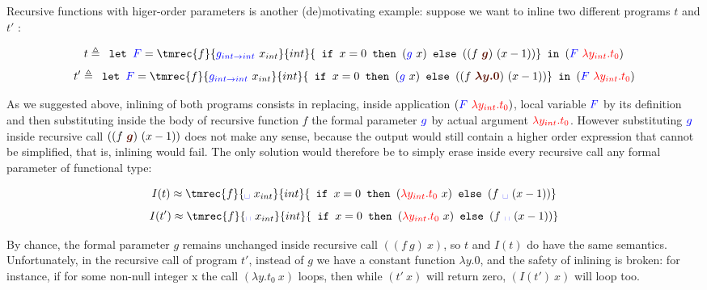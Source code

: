 \documentclass[a4paper,11pt,oneside]{article}
\theoremstyle{plain}
\begin{document}
Recursive functions with  higer-order parameters is another (de)motivating
example: suppose we want to inline two different programs $t$ and $t'$ :\vspace{-0.4cm}
	\begin{figure}[H]
	\label{fig:rec-bad-ex} 
		\begin{footnotesize}
	$$ t \triangleq 
		\texttt{ let } \textcolor{blue}{F} =
  		\tmrec{f}{\textcolor{blue}{g_{int \rightarrow int}}~x_{int}}{int} 
  		{\texttt{ if } x = 0 
  		\texttt{ then } (\textcolor{blue}{g}~x) 
  		\texttt{ else }((f~\textcolor{Sepia}{\boldsymbol{g}})~(x - 1))} 
  		\texttt{ in }
  		(\textcolor{blue}{F}~\textcolor{red}{\lambda y_{int}. t_0})$$ 
  $$t' \triangleq 
  \texttt{ let } \textcolor{blue}{F} =
  \tmrec{f}{\textcolor{blue}{g_{int \rightarrow int}}~x_{int}}{int} 
  {\texttt{ if } x = 0 
  \texttt{ then } (\textcolor{blue}{g}~x) 
  \texttt{ else } ((f~\textcolor{Sepia}{\boldsymbol{\lambda y. 0}})~(x-1))} 
  \texttt{ in }(\textcolor{blue}{F}~\textcolor{red}{\lambda y_{int}.t_0}) $$
  \end{footnotesize}
   
  \end{figure}  \vspace{-0.4cm}
As we suggested above, inlining of both programs consists in replacing,
inside application $(\textcolor{blue}{F}~\textcolor{red}{\lambda y_{int}. t_0})$, 
local variable $\textcolor{blue}{F}$ by its definition and
then substituting inside the body of recursive function $f$ the formal parameter
$\textcolor{blue}{g}$ by actual argument 
$\textcolor{red}{\lambda y_{int}. t_0}$. 
However substituting $\textcolor{blue}{g}$ inside recursive call 
$((f~\textcolor{Sepia}{\boldsymbol{g}})~(x - 1))$ does not make any sense,
because the output would still contain a higher order expression that cannot be
simplified, that is, inlining would fail. The only solution would therefore be to
simply erase inside every recursive call any formal parameter of functional
type:
	\begin{footnotesize}
	$$ I(t) \approx
  \tmrec{f}{\textcolor{blue}{\text{\textvisiblespace}}~x_{int}}{int}
  	{\texttt{ if } x = 0\texttt{ then }(\textcolor{red}{\lambda y_{int}.t_0}~x)
    \texttt{ else } (f~\textcolor{blue}{\text{\textvisiblespace}}~(x-1))} $$
	$$ I(t') \approx
  \tmrec{f}{\textcolor{blue}{\text{\textvisiblespace}}~x_{int}}{int} 
  	{\texttt{ if }x = 0\texttt{ then }(\textcolor{red}{\lambda y_{int}.t_0}~x)
    \texttt{ else }(f~\textcolor{blue}{\text{\textvisiblespace}}~(x-1))} $$
	\end{footnotesize}
By chance, the formal parameter $g$ remains unchanged inside recursive call
$((f~g)~x)$, so $t$ and $I(t)$ do have the same semantics. Unfortunately, in the
recursive call of program $t'$, instead of $g$ we have a constant function
$\lambda y. 0$, and the safety of inlining is broken: for instance, if for some
non-null integer x the call $(\lambda y. t_0~x)$ loops, then while $(t'~x)$ will
return zero, $(I(t')~x)$ will loop too.
\end{document}
